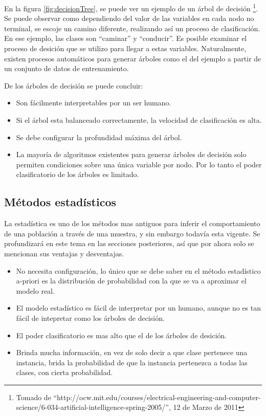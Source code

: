 \documentclass[a4paper, 11pt, oneside]{report}
\begin{document}
En la figura \ref{fig:decisionTree}, se puede ver un ejemplo de un árbol de decisión \footnote{Tomado de ``http://ocw.mit.edu/courses/electrical-engineering-and-computer-science/6-034-artificial-intelligence-spring-2005/'', 12 de Marzo de 2011}. Se puede observar como dependiendo del valor de las variables en cada nodo no terminal, se 
escoje un camino diferente, realizando así un proceso de clasificación. En ese ejemplo, las clases son ``caminar'' y ``conducir''. Es posible examinar el proceso de desición
que se utilizo para llegar a estas variables. Naturalmente, existen procesos automáticos para generar árboles como el del ejemplo a partir de un conjunto de datos de entrenamiento.

De los árboles de decisión se puede concluir:

\begin{itemize}
	\item Son fácilmente interpretables por un ser humano.
	\item Si el árbol esta balanceado correctamente, la velocidad de clasificación es alta.
	\item Se debe configurar la profundidad máxima del árbol.
	\item La mayoría de algoritmos existentes para generar árboles de decisión solo permiten condiciones sobre una única variable por nodo. Por lo tanto el poder clasificatorio de los árboles es limitado.
\end{itemize}

\subsection{Métodos estadísticos}

La estadística es uno de los métodos mas antiguos para inferir el comportamiento de una población a través de una muestra, y sin embargo todavía esta vigente. Se profundizará en este tema en las secciones posteriores, así que por ahora solo se mencionan sus ventajas y desventajas.

\begin{itemize}
	\item No necesita configuración, lo único que se debe saber en el método estadístico a-priori es la distribución de probabilidad con la que se va a  aproximar el modelo real.
	\item El modelo estadístico es fácil de interpretar por un humano, aunque no es tan fácil de intepretar como los árboles de decisión.
	\item El poder clasificatorio es mas alto que el de los árboles de desición.
	\item Brinda mucha información, en vez de solo decir a que clase pertenece una instancia, brida la probabilidad de que la instancia pertenezca a todas las clases, con cierta probabilidad.
\end{itemize}
	
\end{document}
